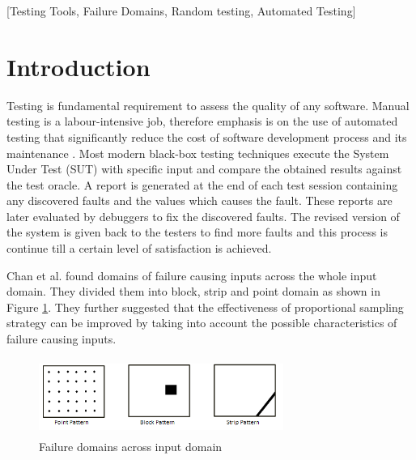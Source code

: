 \documentclass{acm_proc_article-sp}
\begin{document}
[Testing Tools, Failure Domains, Random testing, Automated Testing]

\section{Introduction}\label{sec:intro}

Testing is fundamental requirement to assess the quality of any software. Manual testing is a labour-intensive job, therefore emphasis is on the use of automated testing that significantly reduce the cost of software development process and its maintenance \cite{Beizer1995}. Most modern black-box testing techniques  execute the System Under Test (SUT) with specific input and compare the obtained results against the test oracle. A report is generated at the end of each test session containing any discovered faults and the values which causes the fault. These reports are later evaluated by debuggers to fix the discovered faults. The revised version of the system is given back to the testers to find more faults and this process is continue till a certain level of satisfaction is achieved.


Chan et al.  \cite{Chan1996}  found domains of failure causing inputs across the whole input domain. They divided them into block, strip and point domain as shown in Figure \ref{fig:patterns}. They further suggested that the effectiveness of proportional sampling strategy can be improved by taking into account the possible characteristics of failure causing inputs.

\begin{figure}[h]
\centering
\includegraphics[width=8cm,height=2.5cm]{ART_Patterns.png}
\caption{Failure domains across input domain \cite{Chan1996}}
\label{fig:patterns}
\end{figure}


\end{document}
